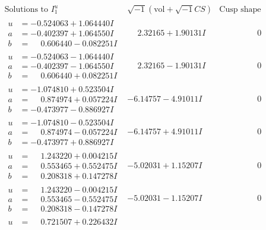 \documentclass[1p]{elsarticle_modified}
\theoremstyle{definition}
\newcommand{\I}{\sqrt{-1}}
\begin{document}
$$\begin{array}{c|c|c}
\text{Solutions to }I^u_{1}& \I (\text{vol} + \sqrt{-1}CS) & \text{Cusp shape}\\
 \hline 
\begin{aligned}
u &= -0.524063 + 1.064440 I \\
a &= -0.402397 + 1.064550 I \\
b &= \phantom{-}0.606440 - 0.082251 I\end{aligned}
 & \phantom{-}2.32165 + 1.90131 I & \phantom{-0.000000 } 0 \\ \hline\begin{aligned}
u &= -0.524063 - 1.064440 I \\
a &= -0.402397 - 1.064550 I \\
b &= \phantom{-}0.606440 + 0.082251 I\end{aligned}
 & \phantom{-}2.32165 - 1.90131 I & \phantom{-0.000000 } 0 \\ \hline\begin{aligned}
u &= -1.074810 + 0.523504 I \\
a &= \phantom{-}0.874974 + 0.057224 I \\
b &= -0.473977 - 0.886927 I\end{aligned}
 & -6.14757 - 4.91011 I & \phantom{-0.000000 } 0 \\ \hline\begin{aligned}
u &= -1.074810 - 0.523504 I \\
a &= \phantom{-}0.874974 - 0.057224 I \\
b &= -0.473977 + 0.886927 I\end{aligned}
 & -6.14757 + 4.91011 I & \phantom{-0.000000 } 0 \\ \hline\begin{aligned}
u &= \phantom{-}1.243220 + 0.004215 I \\
a &= \phantom{-}0.553465 + 0.552475 I \\
b &= \phantom{-}0.208318 + 0.147278 I\end{aligned}
 & -5.02031 + 1.15207 I & \phantom{-0.000000 } 0 \\ \hline\begin{aligned}
u &= \phantom{-}1.243220 - 0.004215 I \\
a &= \phantom{-}0.553465 - 0.552475 I \\
b &= \phantom{-}0.208318 - 0.147278 I\end{aligned}
 & -5.02031 - 1.15207 I & \phantom{-0.000000 } 0 \\ \hline\begin{aligned}
u &= \phantom{-}0.721507 + 0.226432 I \\

\end{aligned}
\end{array}$$
\end{document}
